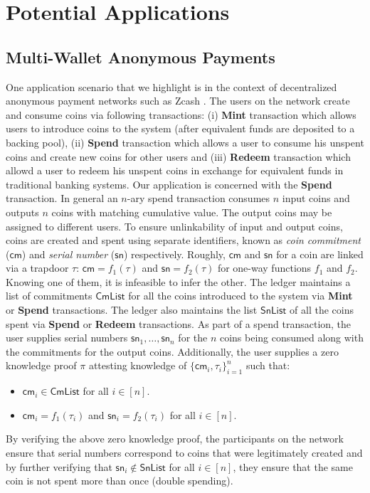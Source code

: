 \section{Potential Applications}
\subsection{Multi-Wallet Anonymous Payments}\label{sec:application1}
One application scenario that we highlight is in the context of decentralized anonymous payment networks such as Zcash \cite{zerocash}. 
The users on the network create and consume coins via following transactions: (i) {\bf Mint} transaction which allows users to introduce coins to the system (after equivalent funds are
deposited to a backing pool), (ii) {\bf Spend} transaction which allows a user to consume his unspent coins and create new coins for other users and 
(iii) {\bf Redeem} transaction which allowd a user to redeem his unspent coins in exchange for equivalent funds in traditional banking systems. Our application 
is concerned with the {\bf Spend} transaction. In general an $n$-ary spend transaction consumes $n$ input coins and outputs $n$ coins with matching 
cumulative value. The output coins may be assigned to different users. To ensure unlinkability of input and output coins, coins are created
and spent using separate identifiers, known as {\em coin commitment} ($\mathsf{cm}$) and {\em serial number} ($\mathsf{sn}$) respectively. 
Roughly, $\mathsf{cm}$
and $\mathsf{sn}$ for a coin are linked via a trapdoor $\tau$: $\mathsf{cm} = f_1(\tau)$ and $\mathsf{sn}=f_2(\tau)$ for one-way functions
$f_1$ and $f_2$. Knowing one of them, it is infeasible to infer the other.  
The ledger maintains a list of commitments $\mathsf{CmList}$ for all the coins introduced to the system via {\bf Mint} or {\bf Spend} transactions. 
The ledger also maintains the list $\mathsf{SnList}$ of all the coins spent via {\bf Spend} or {\bf Redeem} transactions. As part of a spend transaction, 
the user supplies serial numbers $\mathsf{sn}_1,\ldots,\mathsf{sn}_n$ for the $n$ coins being consumed along with the commitments for the output coins.
 Additionally, the 
user supplies a zero knowledge proof $\pi$ attesting knowledge of $\{\mathsf{cm}_i,\tau_i\}_{i=1}^n$ such that:
\begin{itemize}
    \item $\mathsf{cm}_i\in \mathsf{CmList}$ for all $i\in [n]$.
    \item $\mathsf{cm}_i=f_1(\tau_i)$ and $\mathsf{sn}_i=f_2(\tau_i)$ for all $i\in [n]$.
\end{itemize}
By verifying the above zero knowledge proof, the participants on the network ensure that serial numbers correspond to coins that were legitimately 
created and by further verifying that $\mathsf{sn}_i\not\in \mathsf{SnList}$ for all $i\in [n]$, they ensure that the same coin is not 
spent more than once (double spending).

